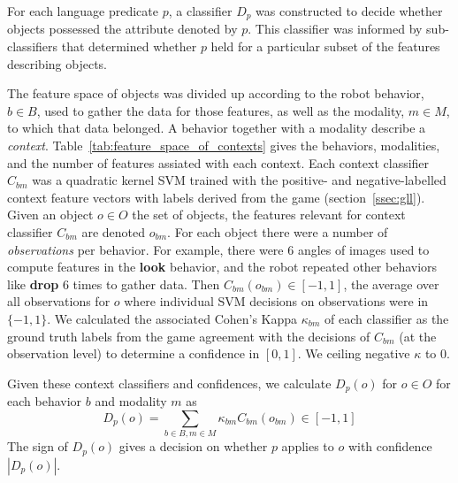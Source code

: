 For each language predicate $p$, a classifier $D_p$ was constructed to decide whether objects possessed the attribute denoted by $p$.
This classifier was informed by sub-classifiers that determined whether $p$ held for a particular subset of the features describing objects.

The feature space of objects was divided up according to the robot behavior, $b\in B$, used to gather the data for those features, as well as the modality, $m\in M$, to which that data belonged.
A behavior together with a modality describe a \textit{context}.
Table~\ref{tab:feature_space_of_contexts} gives the behaviors, modalities, and the number of features assiated with each context.
Each context classifier $C_{bm}$ was a quadratic kernel SVM trained with the positive- and negative-labelled context feature vectors with labels derived from the \ispy game (section~\ref{ssec:gll}).
Given an object $o\in O$ the set of objects, the features relevant for context classifier $C_{bm}$ are denoted $o_{bm}$.
For each object there were a number of \textit{observations} per behavior.
For example, there were 6 angles of images used to compute features in the \textbf{look} behavior, and the robot repeated other behaviors like \textbf{drop} 6 times to gather data.
Then $C_{bm}(o_{bm})\in [-1,1]$, the average over all observations for $o$ where individual SVM decisions on observations were in $\{-1,1\}$.
We calculated the associated Cohen's Kappa $\kappa_{bm}$ of each classifier as the ground truth labels from the \ispy game agreement with the decisions of $C_{bm}$ (at the observation level) to determine a confidence in $[0,1]$.
We ceiling negative $\kappa$ to $0$.

Given these context classifiers and confidences, we calculate $D_p(o)$ for $o\in O$ for each behavior $b$ and modality $m$ as
\begin{equation}
	D_p(o) = \sum_{b\in B,m\in M}{\kappa_{bm} C_{bm}(o_{bm})} \in [-1,1]
\end{equation}
The sign of $D_p(o)$ gives a decision on whether $p$ applies to $o$ with confidence $|D_p(o)|$.